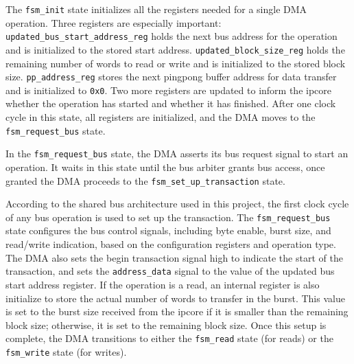 \documentclass[a4paper,11pt,oneside]{report}
\begin{document}
The \texttt{fsm\_init} state initializes all the registers needed for a single DMA operation.  
Three registers are especially important:  
\texttt{updated\_bus\_start\_address\_reg} holds the next bus address for the operation and is initialized to the stored start address.  
\texttt{updated\_block\_size\_reg} holds the remaining number of words to read or write and is initialized to the stored block size.  
\texttt{pp\_address\_reg} stores the next pingpong buffer address for data transfer and is initialized to \texttt{0x0}.  
Two more registers are updated to inform the ipcore whether the operation has started and whether it has finished.  
After one clock cycle in this state, all registers are initialized, and the DMA moves to the \texttt{fsm\_request\_bus} state.

In the \texttt{fsm\_request\_bus} state, the DMA asserts its bus request signal to start an operation.  
It waits in this state until the bus arbiter grants bus access, once granted the DMA proceeds to the \texttt{fsm\_set\_up\_transaction} state.

According to the shared bus architecture used in this project, the first clock cycle of any bus operation is used to set up the transaction.  
The \texttt{fsm\_request\_bus} state configures the bus control signals, including byte enable, burst size, and read/write indication, based on the configuration registers and operation type.  
The DMA also sets the begin transaction signal high to indicate the start of the transaction,  
and sets the \texttt{address\_data} signal to the value of the updated bus start address register.  
If the operation is a read, an internal register is also initialize to store the actual number of words to transfer in the burst.  
This value is set to the burst size received from the ipcore if it is smaller than the remaining block size; otherwise, it is set to the remaining block size.  
Once this setup is complete, the DMA transitions to either the \texttt{fsm\_read} state (for reads) or the \texttt{fsm\_write} state (for writes).
\end{document}
